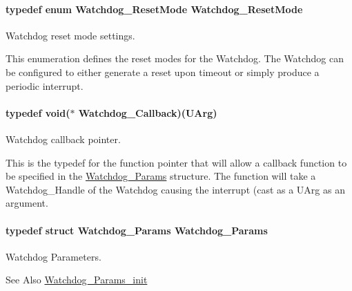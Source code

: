\paragraph[{Watchdog\-\_\-\-Reset\-Mode}]{\setlength{\rightskip}{0pt plus 5cm}typedef enum {\bf Watchdog\-\_\-\-Reset\-Mode}  {\bf Watchdog\-\_\-\-Reset\-Mode}}\label{_watchdog_8h_a49befb9cfb12eb30c8832809bcbaa3a4}


Watchdog reset mode settings. 

This enumeration defines the reset modes for the Watchdog. The Watchdog can be configured to either generate a reset upon timeout or simply produce a periodic interrupt. 
\paragraph[{Watchdog\-\_\-\-Callback}]{\setlength{\rightskip}{0pt plus 5cm}typedef void($\ast$ Watchdog\-\_\-\-Callback)(U\-Arg)}\label{_watchdog_8h_a779c2644e40b760c2418b18f2c167479}


Watchdog callback pointer. 

This is the typedef for the function pointer that will allow a callback function to be specified in the \hyperlink{struct_watchdog___params}{Watchdog\-\_\-\-Params} structure. The function will take a Watchdog\-\_\-\-Handle of the Watchdog causing the interrupt (cast as a U\-Arg as an argument. 
\paragraph[{Watchdog\-\_\-\-Params}]{\setlength{\rightskip}{0pt plus 5cm}typedef struct {\bf Watchdog\-\_\-\-Params}  {\bf Watchdog\-\_\-\-Params}}\label{_watchdog_8h_a001003d331ef831675e9a8388a81041c}


Watchdog Parameters. 

\begin{DoxySeeAlso}{See Also}
\hyperlink{_watchdog_8h_a6a6f54cfdac33d3bf33464a212262afc}{Watchdog\-\_\-\-Params\-\_\-init} 
\end{DoxySeeAlso}
